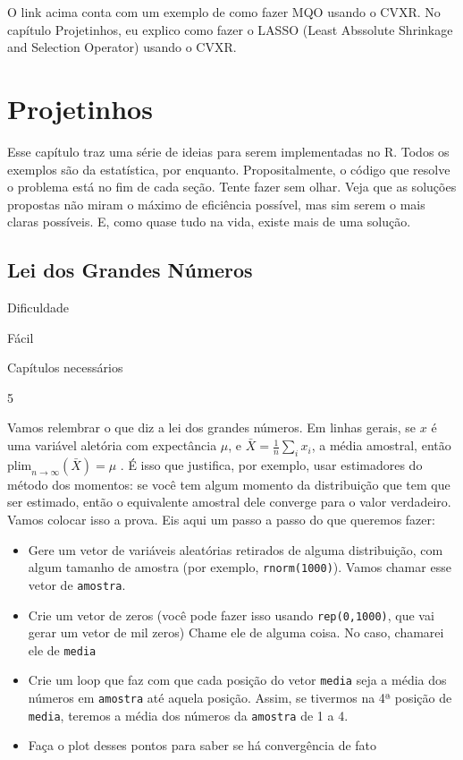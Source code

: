\documentclass[
]{book}
\providecommand{\tightlist}{%
  \setlength{\itemsep}{0pt}\setlength{\parskip}{0pt}}
\begin{document}
O link acima conta com um exemplo de como fazer MQO usando o CVXR. No capítulo Projetinhos, eu explico como fazer o LASSO (Least Abssolute Shrinkage and Selection Operator) usando o CVXR.

\hypertarget{projetinhos}{%
\chapter{Projetinhos}\label{projetinhos}}

Esse capítulo traz uma série de ideias para serem implementadas no R. Todos os exemplos são da estatística, por enquanto. Propositalmente, o código que resolve o problema está no fim de cada seção. Tente fazer sem olhar. Veja que as soluções propostas não miram o máximo de eficiência possível, mas sim serem o mais claras possíveis. E, como quase tudo na vida, existe mais de uma solução.

\hypertarget{lei-dos-grandes-nuxfameros}{%
\section{Lei dos Grandes Números}\label{lei-dos-grandes-nuxfameros}}

Dificuldade

Fácil

Capítulos necessários

5

Vamos relembrar o que diz a lei dos grandes números. Em linhas gerais, se \(x\) é uma variável aletória com expectância \(\mu\), e \(\bar{X} = \frac{1}{n}\sum_i x_i\), a média amostral, então \(\text{plim}_{n \rightarrow \infty}(\bar{X}) = \mu\) . É isso que justifica, por exemplo, usar estimadores do método dos momentos: se você tem algum momento da distribuição que tem que ser estimado, então o equivalente amostral dele converge para o valor verdadeiro. Vamos colocar isso a prova. Eis aqui um passo a passo do que queremos fazer:

\begin{itemize}
\tightlist
\item
  Gere um vetor de variáveis aleatórias retirados de alguma distribuição, com algum tamanho de amostra (por exemplo, \texttt{rnorm(1000)}). Vamos chamar esse vetor de \texttt{amostra}.
\item
  Crie um vetor de zeros (você pode fazer isso usando \texttt{rep(0,1000)}, que vai gerar um vetor de mil zeros) Chame ele de alguma coisa. No caso, chamarei ele de \texttt{media}
\item
  Crie um loop que faz com que cada posição do vetor \texttt{media} seja a média dos números em \texttt{amostra} até aquela posição. Assim, se tivermos na 4ª posição de \texttt{media}, teremos a média dos números da \texttt{amostra} de 1 a 4.
\item
  Faça o plot desses pontos para saber se há convergência de fato
\end{itemize}
\end{document}
